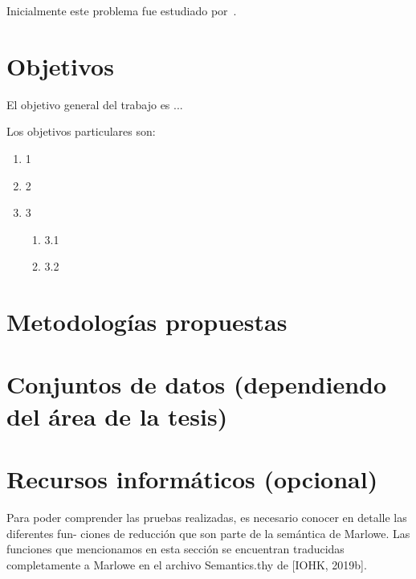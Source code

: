 \documentclass[12pt, oneside]{book}
\begin{document}
Inicialmente este problema fue estudiado por~\cite{knuth2014art}.

\bigskip


\chapter{Objetivos}

El objetivo general del trabajo es ...

Los objetivos particulares son:

\begin{enumerate}
    \item 1
    \item 2
    \item 3
          \begin{enumerate}
              \item 3.1
              \item 3.2
          \end{enumerate}
\end{enumerate}

\bigskip


\chapter{Metodologías propuestas}

\bigskip


\chapter{Conjuntos de datos (dependiendo del área de la tesis)}

\bigskip


\chapter{Recursos informáticos (opcional)}

Para poder comprender las pruebas realizadas, es necesario conocer en detalle las diferentes fun-
ciones de reducción que son parte de la semántica de Marlowe. Las funciones que mencionamos
en esta sección se encuentran traducidas completamente a Marlowe en el archivo Semantics.thy
de [IOHK, 2019b].
\end{document}
